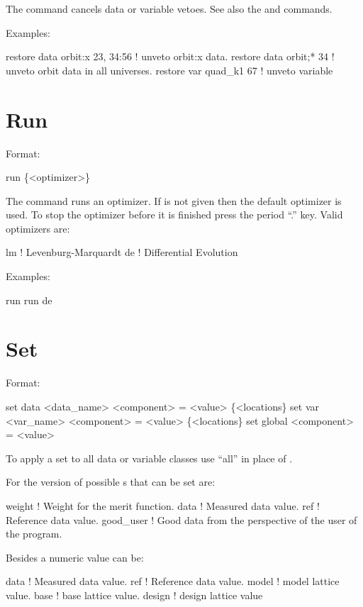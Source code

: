 \vskip 0.2in 
The  command cancels data or variable
vetoes. See also the 
and  commands.

Examples:
\begin{example}
  restore data orbit:x  23, 34:56 ! unveto orbit:x data.
  restore data orbit;* 34         ! unveto orbit data in all universes.
  restore var quad_k1 67          ! unveto variable
\end{example}


\section{Run}
\label{s:run}

Format:
\begin{example}
  run \{<optimizer>\}
\end{example}

\vskip 0.2in 
The  command runs an optimizer. If  is not
given then the default optimizer is used. To stop the optimizer before
it is finished press the period ``.'' key.  Valid optimizers are:
\begin{example}
  lm            ! Levenburg-Marquardt
  de            ! Differential Evolution
\end{example}

Examples:
\begin{example}
  run 
  run de
\end{example}

\section{Set}
\label{s:set}

Format:
\begin{example}
  set data <data_name> <component> = <value> \{<locations\}
  set var <var_name> <component> = <value> \{<locations\}
  set global <component> = <value>
\end{example}

\vskip 0.2in
To apply a set to all data or variable classes use ``all''
in place of .

For the  version of  possible 
s that can be set are:
\begin{example}
  weight      ! Weight for the merit function.
  data        ! Measured data value.
  ref         ! Reference data value.
  good_user   ! Good data from the perspective of the user of the \tao program.
\end{example}
Besides a numeric value  can be:
\begin{example}
  data        ! Measured data value.
  ref         ! Reference data value.
  model       ! model lattice value.
  base        ! base lattice value.
  design      ! design lattice value
\end{example}

